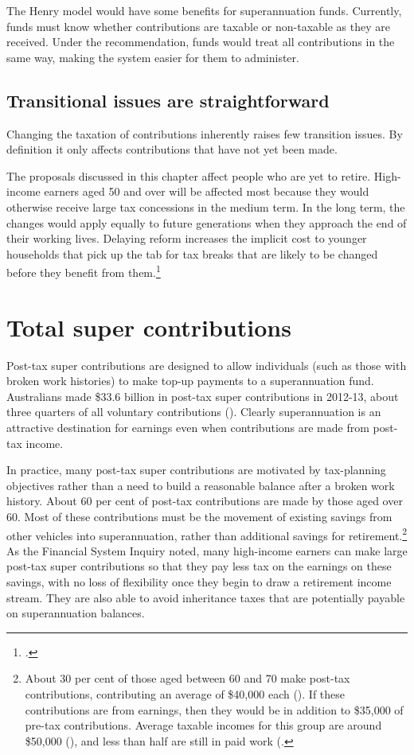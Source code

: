 The Henry model would have some benefits for superannuation funds. Currently, funds must know whether contributions are taxable or non-taxable as they are received. Under the recommendation, funds would treat all contributions in the same way, making the system easier for them to administer.

\section{Transitional issues are straightforward}
Changing the taxation of contributions inherently raises few transition issues. By definition it only affects contributions that have not yet been made.

The proposals discussed in this chapter affect people who are yet to retire. High-income earners aged 50 and over will be affected most because they would otherwise receive large tax concessions in the medium term. In the long term, the changes would apply equally to future generations when they approach the end of their working lives. Delaying reform increases the implicit cost to younger households that pick up the tab for tax breaks that are likely to be changed before they benefit from them.\footcite{DaleyWoodWeidmannEtAl2014}

\chapter{Total super contributions} 
Post-tax super contributions are designed to allow individuals (such as those with broken work histories) to make top-up payments to a superannuation fund. Australians made \$33.6 billion in post-tax super contributions in 2012-13, about three quarters of all voluntary contributions (). Clearly superannuation is an attractive destination for earnings even when contributions are made from post-tax income. 

In practice, many post-tax super contributions are motivated by tax-planning objectives rather than a need to build a reasonable balance after a broken work history. About 60 per cent of post-tax contributions are made by those aged over 60. Most of these contributions must be the movement of existing savings from other vehicles into superannuation, rather than additional savings for retirement.\footnote{About 30 per cent of those aged between 60 and 70 make post-tax contributions, contributing an average of \$40,000 each (). If these contributions are from earnings, then they would be in addition to \$35,000 of pre-tax contributions. Average taxable incomes for this group are around \$50,000 (\textcite{ATO2015SampleFile1213}), and less than half are still in paid work (\textcite[][58]{ProductivityCommission2013AgeingAustralia}.}  As the Financial System Inquiry noted, many high-income earners can make large post-tax super contributions so that they pay less tax on the earnings on these savings, with no loss of flexibility once they begin to draw a retirement income stream.  They are also able to avoid inheritance taxes that are potentially payable on superannuation balances.

